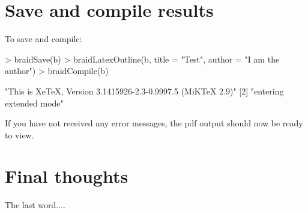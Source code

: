 \documentclass[a4paper]{article}
\begin{document}
\section{Save and compile results}

To save and compile:

\begin{Schunk}
\begin{Sinput}
> braidSave(b)
> braidLatexOutline(b, title = "Test", author = "I am the author")
> braidCompile(b)
\end{Sinput}
\begin{Soutput}
[1] "This is XeTeX, Version 3.1415926-2.3-0.9997.5 (MiKTeX 2.9)"
[2] "entering extended mode"                                    
\end{Soutput}
\end{Schunk}

If you have not received any error messages, the pdf output should now be ready to view.


\section{Final thoughts}

The last word....


\end{document}
